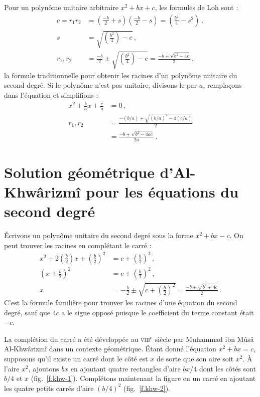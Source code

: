Pour un polynôme unitaire arbitraire $x^2+bx+c$, les formules de Loh sont :
\begin{align*}
c=r_1r_2&=\left(\frac{-b}{2}+s\right)  \left(\frac{-b}{2}-s\right)=\left(\frac{b^2}{4}-s^2\right)\,,\\
s&=\sqrt{\left(\frac{b^2}{4}\right)-c}\,,\\
r_1,r_2&=\frac{-b}{2}\pm\sqrt{\left(\frac{b^2}{4}\right)-c}=\frac{-b\pm\sqrt{b^2-4c}}{2}\,,
\end{align*}
la formule traditionnelle pour obtenir les racines d'un polynôme unitaire du second degré. Si le polynôme n'est pas unitaire, divisons-le par $a$, remplaçons dans l'équation et simplifions :
\begin{align*}
x^2+\frac{b}{a}x+\frac{c}{a}&=0\,,\\
r_1,r_2&=\frac{-(b/a)\pm\sqrt{(b/a)^2-4(c/a)}}{2}\\
&=\frac{-b\pm\sqrt{b^2-4ac}}{2a}\,.
\end{align*}

\section{Solution géométrique d'Al-Khwârizmî pour les équations du second degré }\label{s.khwar}

Écrivons un polynôme unitaire du second degré sous la forme $x^2+bx-c$. On peut trouver les racines en complétant le carré :
\begin{align*}
x^2+2\left(\frac{b}{2}\right)x+\left(\frac{b}{2}\right)^2&=c+\left(\frac{b}{2}\right)^2\,,\\
\left(x+\frac{b}{2}\right)^2&=c+\left(\frac{b}{2}\right)^2\,,\\
x&=-\frac{b}{2}\pm\sqrt{c+\left(\frac{b}{2}\right)^2}=
\frac{-b\pm\sqrt{b^2+4c}}{2}\,.
\end{align*}
C'est la formule familière pour trouver les racines d'une équation du second degré, sauf que $4c$ a le signe opposé puisque le coefficient du terme constant était $-c$.

La complétion du carré a été développée au \textsc{viii}$^\text{e}$  siècle par Muhammad ibn Mûsâ Al-Khwârizmî dans un contexte géométrique. Étant donné l'équation $x^2+bx=c$, supposons qu'il existe un carré dont le côté est $x$ de sorte que son aire soit  $x^2$.
À l'aire $x^2$, ajoutons $bx$ en ajoutant quatre rectangles d'aire $bx/4$ dont les côtés sont $b/4$ et $x$ (fig.~\ref{f.khw-1}). Complétons maintenant la figure  en un carré en ajoutant les quatre petits carrés d'aire $(b/4)^2$ (fig.~\ref{f.khw-2}).

